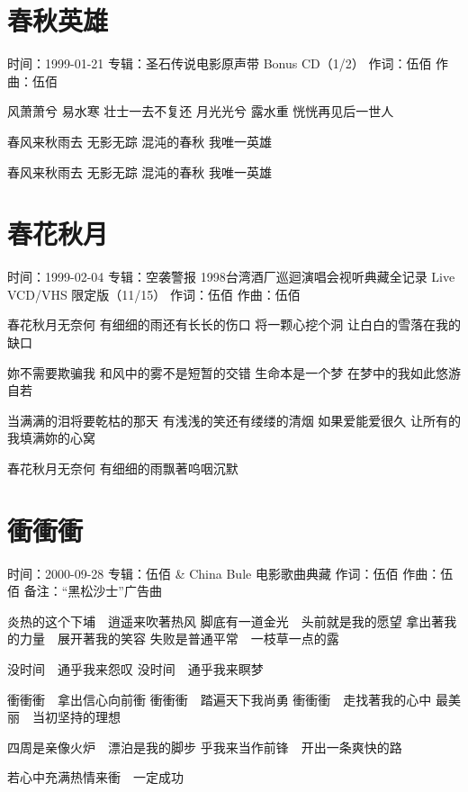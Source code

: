 \documentclass[UTF8,a4paper,oneside,twocolumn,12pt]{ctexbook}
\newcommand{\infopair}[2]{\textbullet #1：#2}
\newcommand{\zc}[1][伍佰]{\infopair{作词}{#1}}
\newcommand{\zq}[1][伍佰]{\infopair{作曲}{#1}}
\newcommand{\zj}[1]{\infopair{专辑}{#1}}
\newcommand{\sj}[1]{\infopair{时间}{#1}}
\newcommand{\bz}[1]{\infopair{备注}{#1}}
\newenvironment{info}{\begin{flushleft}\kaishu
	}
	{\end{flushleft}\normalsize\yahei\par}
\newenvironment{lyric}{
	}
{}
\begin{document}
\section{春秋英雄}
\begin{info}
	\sj{1999-01-21}
	\zj{圣石传说电影原声带 Bonus CD（1/2）}
	\zc
	\zq
\end{info}
\begin{lyric}
	风萧萧兮 易水寒 壮士一去不复还
	月光光兮 露水重 恍恍再见后一世人

	春风来秋雨去 无影无踪
	混沌的春秋 我唯一英雄

	春风来秋雨去 无影无踪
	混沌的春秋 我唯一英雄
\end{lyric}

\section{春花秋月}
\begin{info}
	\sj{1999-02-04}
	\zj{空袭警报 1998台湾酒厂巡迴演唱会视听典藏全记录 Live VCD/VHS 限定版（11/15）}
	\zc
	\zq
\end{info}
\begin{lyric}%
	春花秋月无奈何
	有细细的雨还有长长的伤口
	将一颗心挖个洞
	让白白的雪落在我的缺口

	妳不需要欺骗我
	和风中的雾不是短暂的交错
	生命本是一个梦
	在梦中的我如此悠游自若

	当满满的泪将要乾枯的那天
	有浅浅的笑还有缕缕的清烟
	如果爱能爱很久
	让所有的我填满妳的心窝

	春花秋月无奈何
	有细细的雨飘著呜咽沉默
\end{lyric}

\section{衝衝衝}
\begin{info}
	\sj{2000-09-28}
	\zj{伍佰 \& China Bule 电影歌曲典藏}
	\zc
	\zq
	\bz{“黑松沙士”广告曲}
\end{info}
\begin{lyric}
	炎热的这个下埔　逍遥来吹著热风
	脚底有一道金光　头前就是我的愿望
	拿出著我的力量　展开著我的笑容
	失败是普通平常　一枝草一点的露

	没时间　通乎我来怨叹
	没时间　通乎我来瞑梦

	衝衝衝　拿出信心向前衝
	衝衝衝　踏遍天下我尚勇
	衝衝衝　走找著我的心中
	最美丽　当初坚持的理想

	四周是亲像火炉　漂泊是我的脚步
	乎我来当作前锋　开出一条爽快的路

	若心中充满热情来衝　一定成功
\end{lyric}
\end{document}
